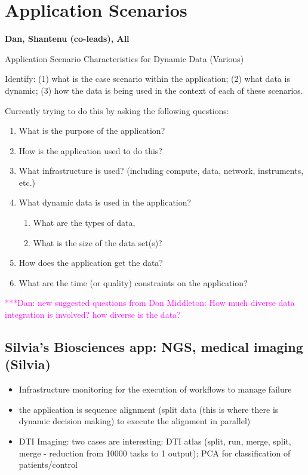 \documentclass[preprint,12pt]{article}
\newcommand{\katznote}[1]{ {\textcolor{magenta}    { ***Dan:      #1 }}}
\newcommand{\katznote}[1]{}
\begin{document}
\section{Application Scenarios} {\bf Dan, Shantenu (co-leads), All}

Application Scenario Characteristics for Dynamic Data (Various)

Identify: (1) what is the case scenario within the application; (2) what data is dynamic; (3)  how the data is being used in the context of each of these scenarios.

Currently trying to do this by asking the following questions:
\begin{enumerate}
\item What is the purpose of the application?
\item How is the application used to do this?
\item What infrastructure is used? (including compute, data, network, instruments, etc.)
\item What dynamic data is used in the application?
\begin{enumerate}
\item What are the types of data,
\item What is the size of the data set(s)?
\end{enumerate}
\item How does the application get the data?
\item What are the time (or quality) constraints on the application?
\end{enumerate}

\katznote{new suggested questions from Don Middleton: How much diverse data integration is involved?  how diverse is the data?}

\subsection{Silvia's Biosciences app: NGS, medical imaging (Silvia)\label{bioSilvia}}

\begin{itemize}
\item Infrastructure monitoring for the execution of workflows to
  manage failure
\item the application is sequence alignment (split data (this is where there is dynamic decision making) to execute the alignment in parallel)
\item DTI Imaging: two cases are interesting: DTI atlas (split, run, merge, split, merge - reduction from 10000 tasks to 1 output); PCA for classification of patients/control
\end{itemize}
\end{document}
